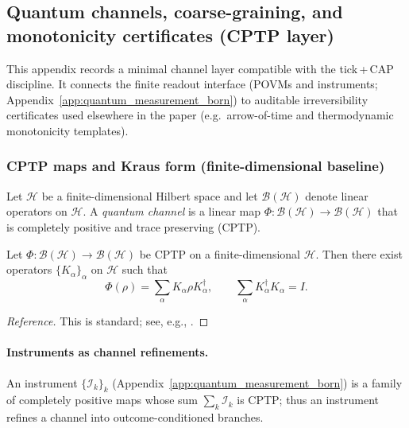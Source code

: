 \subsection{Quantum channels, coarse-graining, and monotonicity certificates (CPTP layer)}
\label{app:quantum_channels_cptp_stinespring}

This appendix records a minimal channel layer compatible with the tick\,+\,CAP discipline.
It connects the finite readout interface (POVMs and instruments; Appendix~\ref{app:quantum_measurement_born}) to auditable irreversibility certificates used elsewhere in the paper (e.g.\ arrow-of-time and thermodynamic monotonicity templates).

\subsubsection{CPTP maps and Kraus form (finite-dimensional baseline)}
\begin{definition}
\label{def:z128_cptp_channel}
Let $\mathcal{H}$ be a finite-dimensional Hilbert space and let $\mathcal{B}(\mathcal{H})$ denote linear operators on $\mathcal{H}$.
A \emph{quantum channel} is a linear map $\Phi:\mathcal{B}(\mathcal{H})\to\mathcal{B}(\mathcal{H})$ that is completely positive and trace preserving (CPTP).
\end{definition}

\begin{theorem}
\label{thm:z128_kraus_representation}
Let $\Phi:\mathcal{B}(\mathcal{H})\to\mathcal{B}(\mathcal{H})$ be CPTP on a finite-dimensional $\mathcal{H}$.
Then there exist operators $\{K_\alpha\}_\alpha$ on $\mathcal{H}$ such that
\[
\Phi(\rho)=\sum_\alpha K_\alpha \rho K_\alpha^\dagger,
\qquad
\sum_\alpha K_\alpha^\dagger K_\alpha = I.
\]
\end{theorem}
\begin{proof}[Reference]
This is standard; see, e.g., \cite{Kraus1983,NielsenChuang2000}.
\end{proof}

\paragraph{Instruments as channel refinements.}
An instrument $\{\mathcal{I}_k\}_k$ (Appendix~\ref{app:quantum_measurement_born}) is a family of completely positive maps whose sum $\sum_k \mathcal{I}_k$ is CPTP; thus an instrument refines a channel into outcome-conditioned branches.

